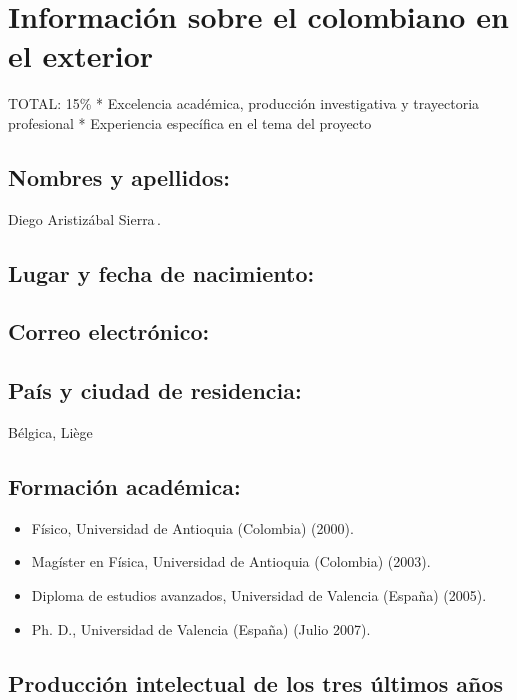 \section{Información sobre el colombiano en el exterior}
\begin{evaluacion}
  TOTAL: 15\%
  * Excelencia académica, producción investigativa y trayectoria profesional
  * Experiencia específica en el tema del proyecto
\end{evaluacion}
\subsection{Nombres y apellidos:}
Diego Aristizábal Sierra\,.
\subsection{Lugar y fecha de nacimiento:}
\fnaristizabal
\subsection{Correo electrónico:}
\emaristizabal
\subsection{País y ciudad de residencia:}
Bélgica, Liège
\subsection{Formación académica:}
\begin{itemize}
\item Físico, Universidad de Antioquia (Colombia) (2000).
\item Magíster en Física, Universidad de Antioquia (Colombia) (2003).
\item Diploma de estudios avanzados, Universidad de Valencia (España) (2005).  
\item Ph. D., Universidad de Valencia (España) (Julio 2007).
\end{itemize}
\subsection{Producción intelectual de los tres últimos años}
